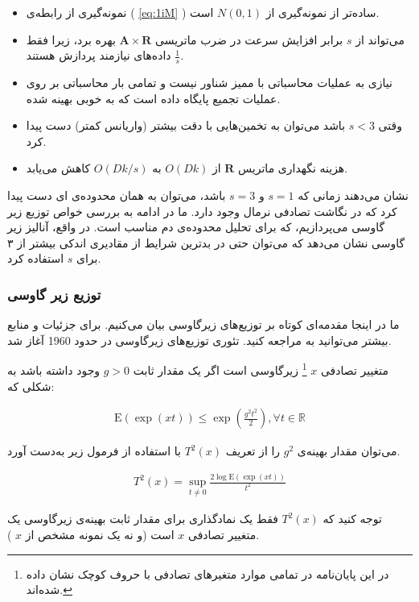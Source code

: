 \begin{itemize}
\item
نمونه‌گیری از رابطه‌ی (%
\ref{eq:1iM}%
) ساده‌تر از نمونه‌گیری از
$N(0,1)$
است.
\item
می‌تواند از 
$s$
برابر افزایش سرعت در ضرب ماتریسی 
$\mathbf{A} \times \mathbf{R}$
بهره برد، زیرا فقط
$\frac{1}{s}$
داده‌های نیازمند پردازش هستند.
\item
نیازی به عملیات محاسباتی با ممیز شناور نیست و تمامی بار محاسباتی بر روی عملیات تجمیع پایگاه داده است که به خوبی بهینه شده.
\item
وقتی 
$s<3$
باشد می‌توان به تخمین‌هایی با دقت بیشتر (واریانس کمتر) دست پیدا کرد.
\item
هزینه نگهداری ماتریس 
$\mathbf{R}$
از 
$O(Dk)$
به 
$O(Dk/s)$
کاهش می‌یابد.
\end{itemize}

\cite{litez2, litez3}
نشان ‌می‌دهند زمانی که 
$s=1$
و 
$s=3$
باشد، می‌توان به همان محدوده‌ی 
ای دست پیدا کرد که در نگاشت تصادفی نرمال وجود دارد. ما در ادامه به بررسی خواص توزیع زیر گاوسی می‌پردازیم، که برای تحلیل محدوده‌ی دم مناسب است. در واقع، آنالیز زیر گاوسی نشان می‌دهد که می‌توان حتی در بدترین شرایط از مقادیری اندکی بیشتر از ۳ برای 
$s$
استفاده کرد.

\subsubsection{
توزیع زیر گاوسی
}

ما در اینجا مقدمه‌ای کوتاه بر توزیع‌های زیرگاوسی بیان می‌کنیم. برای جزئیات و منابع بیشتر می‌توانید به
\cite{litez40}
مراجعه کنید. تئوری توزیع‌های زیرگاوسی در حدود 1960 آغاز شد.

متغییر تصادفی 
$x$
\footnote{
در این پایان‌نامه در تمامی موارد متغیرهای تصادفی با حروف کوچک نشان داده شده‌اند.
}
زیرگاوسی است اگر یک مقدار ثابت 
$g > 0$
وجود داشته باشد به شکلی که:

\begin{align}
\mathrm{E}(\exp (xt)) \leq \exp \left( \frac{g^2 t^2}{2} \right), \forall t \in \mathbb{R}
\label{eq:1iN}
\end{align}

می‌توان مقدار بهینه‌ی 
$g^2$ 
را از تعریف 
$T^2(x)$
با استفاده از فرمول زیر به‌دست آورد.

\begin{align}
T^2(x) = \sup_{t \neq 0} \frac{2 \log \mathrm{E}\left(\exp(xt)\right)}{t^2}
\label{eq:1iP}
\end{align}

توجه کنید که 
$T^2(x)$
فقط یک نمادگذاری برای مقدار ثابت بهینه‌ی زیرگاوسی یک متغییر تصادفی 
$x$
است (و نه یک نمونه مشخص از 
$x$
).

